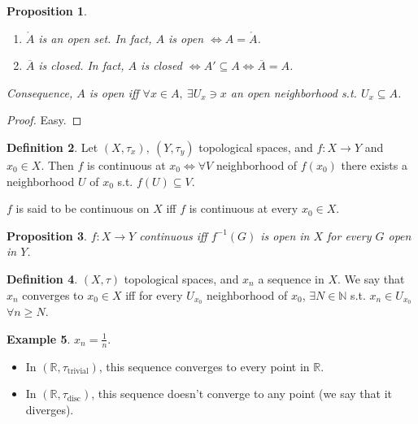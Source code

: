 \documentclass[11pt,a4paper]{article}
\theoremstyle{definition}
\newtheorem{definition}{Definition}[section]
\newtheorem{example}[definition]{Example}
\theoremstyle{plain}
\newtheorem{proposition}[definition]{Proposition}
\theoremstyle{remark}
\newcommand{\R}{\mathbb{R}}
\newcommand{\N}{\mathbb{N}}
\newcommand{\1}{\mathbbm{1}}
\begin{document}
\begin{proposition}
    \begin{enumerate}
        \item $\mathring{A}$ is an open set. In fact, $A$ is open $\iff A = \mathring{A}$.
        \item $\overline{A}$ is closed. In fact, $A$ is closed $\iff A' \subseteq A \iff \overline{A} = A$.
    \end{enumerate}

    Consequence, $A$ is open iff $\forall x \in A, \ \exists U_x \ni x$ an open neighborhood s.t. $U_x \subseteq A$.
\end{proposition}

\begin{proof}
    Easy.
\end{proof}

\begin{definition}
    Let $(X, \tau_x), \ (Y, \tau_y)$ topological spaces, and $f \colon X \to Y$ and $x_0 \in X$. Then $f$ is continuous at $x_0 \iff \forall V$ neighborhood of $f(x_0)$ there exists a neighborhood $U$ of $x_0$ s.t. 
    $f(U) \subseteq V$.

    $f$ is said to be continuous on $X$ iff $f$ is continuous at every $x_0 \in X$.
\end{definition}

\begin{proposition}
    $f \colon X \to Y$ continuous iff $f^{-1}(G)$ is open in $X$ for every $G$ open in $Y$. 
\end{proposition}

\begin{definition}
    $(X, \tau)$ topological spaces, and $x_n$ a sequence in $X$. We say that $x_n$ converges to $x_0 \in X$ iff for every $U_{x_0}$ neighborhood of $x_0$, $\exists N \in \N$
    s.t. $x_n \in U_{x_0}$ $\forall n \ge N$. 
\end{definition}

\begin{example}
    $x_n = \frac{1}{n}$. 
    \begin{itemize}
        \item In $(\R, \tau_{\text{trivial}})$, this sequence converges to every point in $\R$.
        \item In $(\R, \tau_{\text{disc}})$, this sequence doesn't converge to any point (we say that it diverges).
    \end{itemize}
\end{example}
\end{document}
